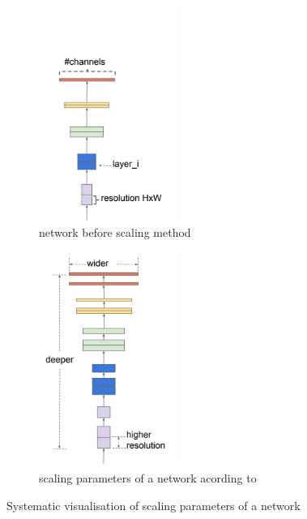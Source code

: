 \begin{figure}[H]
    \centering
    \begin{subfigure}{0.4\textwidth}
        \centering
        \includegraphics[width=\linewidth, height=7cm, keepaspectratio]{PICs/backbones/EfficientNet_baseline.jpg}
        \caption{network before scaling method}
        \label{fig:efficientNet_baseline}
    \end{subfigure}
    \qquad
    \begin{subfigure}{0.4\textwidth}
        \centering
        \includegraphics[width=\linewidth, height=7cm, keepaspectratio]{PICs/backbones/EfficientNet_scaling.jpg}
        \caption{scaling parameters of a network acording to \cite{EfficientNet}}
        \label{fig:efficientNet_scaled}
    \end{subfigure}
    \caption{Systematic visualisation of scaling parameters of a network \cite{EfficientNet}}
    \label{fig:efficientNet_networks}
\end{figure}